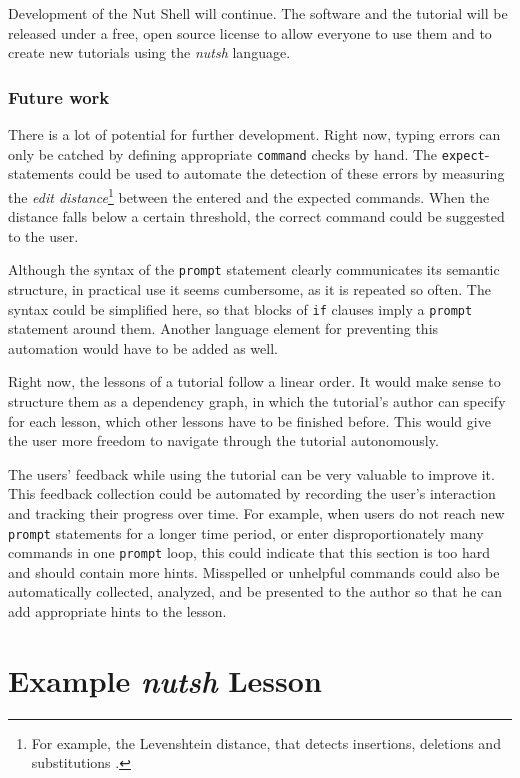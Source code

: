 \documentclass[paper=a4,abstract=on,cleardoublepage=empty,numbers=noenddot,toc=bib,12pt,appendixprefix=true]{scrreprt}
\begin{document}
Development of the Nut Shell will continue. The software and the tutorial will be released under a free, open source license to allow everyone to use them and to create new tutorials using the \emph{nutsh} language.

\subsection*{Future work}

There is a lot of potential for further development. Right now, typing errors can only be catched by defining appropriate \texttt{command} checks by hand. The \texttt{expect}-statements could be used to automate the detection of these errors by measuring the \emph{edit distance}\footnote{For example, the Levenshtein distance, that detects insertions, deletions and substitutions \cite{levenshtein66}.} between the entered and the expected commands. When the distance falls below a certain threshold, the correct command could be suggested to the user.

Although the syntax of the \texttt{prompt} statement clearly communicates its semantic structure, in practical use it seems cumbersome, as it is repeated so often. The syntax could be simplified here, so that blocks of \texttt{if} clauses imply a \texttt{prompt} statement around them. Another language element for preventing this automation would have to be added as well.

Right now, the lessons of a tutorial follow a linear order. It would make sense to structure them as a dependency graph, in which the tutorial's author can specify for each lesson, which other lessons have to be finished before. This would give the user more freedom to navigate through the tutorial autonomously.

The users' feedback while using the tutorial can be very valuable to improve it. This feedback collection could be automated by recording the user's interaction and tracking their progress over time. For example, when users do not reach new \texttt{prompt} statements for a longer time period, or enter disproportionately many commands in one \texttt{prompt} loop, this could indicate that this section is too hard and should contain more hints. Misspelled or unhelpful commands could also be automatically collected, analyzed, and be presented to the author so that he can add appropriate hints to the lesson.

\appendix

\chapter{Example \emph{nutsh} Lesson}
\label{sec:nutshexample}
\end{document}
